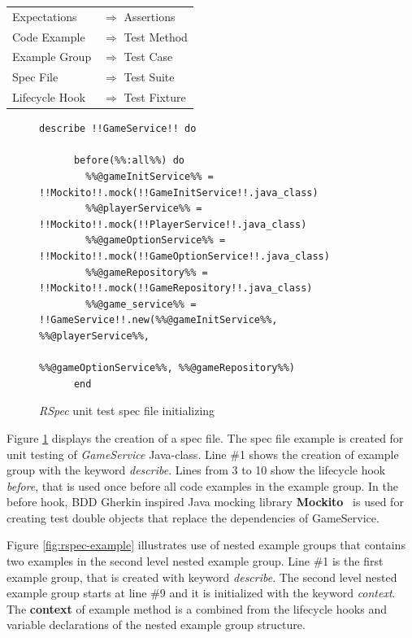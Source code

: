     \begin{longtable}{@{}p{}p{}@{}}
    Expectations & $\Longrightarrow$  \textrm{Assertions} \\
    Code Example & $\Longrightarrow$  \textrm{Test Method} \\
    Example Group & $\Longrightarrow$  \textrm{Test Case} \\
    Spec File & $\Longrightarrow$  \textrm{Test Suite} \\
    Lifecycle Hook & $\Longrightarrow$  \textrm{Test Fixture} \\
    \end{longtable}

    \begin{figure}[H]
        \begin{lstlisting}[style=ruby]
    describe !!GameService!! do

      before(%%:all%%) do
        %%@gameInitService%% = !!Mockito!!.mock(!!GameInitService!!.java_class)
        %%@playerService%% = !!Mockito!!.mock(!!PlayerService!!.java_class)
        %%@gameOptionService%% = !!Mockito!!.mock(!!GameOptionService!!.java_class)
        %%@gameRepository%% = !!Mockito!!.mock(!!GameRepository!!.java_class)
        %%@game_service%% = !!GameService!!.new(%%@gameInitService%%, %%@playerService%%,
                                           %%@gameOptionService%%, %%@gameRepository%%)
      end
        \end{lstlisting}
        \caption{\textit{RSpec} unit test spec file initializing}
        \label{fig:rspec-init}
    \end{figure}

    Figure \ref{fig:rspec-init} displays the creation of a spec file. The spec file example is created for unit testing
    of \textit{GameService} Java-class. Line \#1 shows the creation of example group with the keyword \textit{describe}. Lines from
    3 to 10 show the lifecycle hook \textit{before}, that is used once before all code examples in the example group.
    In the before hook, BDD Gherkin inspired Java mocking library \textbf{Mockito}~\cite{mockito} is used for
    creating test double objects that replace the dependencies of GameService.

    Figure \ref{fig:rspec-example} illustrates use of nested example groups that contains two examples in the second
    level nested example group. Line \#1 is the first example group, that is created with keyword \textit{describe}. The second
    level nested example group starts at line \#9 and it is initialized with the keyword \textit{context}. The \textbf{context} of
    example method is a combined from the lifecycle hooks and variable declarations of the nested example group structure.

